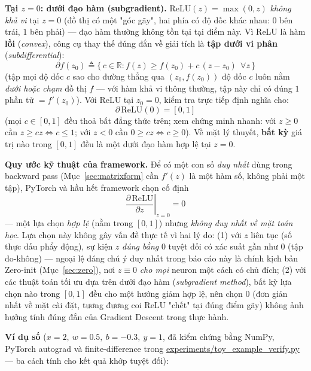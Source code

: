 \documentclass[12pt,a4paper]{article}
\newcommand{\en}[1]{\textit{#1}}
\begin{document}
\textbf{Tại $z=0$: dưới đạo hàm (subgradient).} $\mathrm{ReLU}(z)=\max(0,z)$
\emph{không khả vi} tại $z=0$ (đồ thị có một "góc gãy", hai phía có độ dốc
khác nhau: $0$ bên trái, $1$ bên phải) --- đạo hàm thường không tồn tại tại
điểm này. Vì ReLU là hàm \textbf{lồi} (\en{convex}), công cụ thay thế đúng
đắn về giải tích là \textbf{tập dưới vi phân} (\en{subdifferential}):
$$\partial f(z_0) \triangleq \{\,c\in\mathbb R : f(z) \ge f(z_0) + c\,(z-z_0)\ \ \forall z\,\}$$
(tập mọi độ dốc $c$ sao cho đường thẳng qua $(z_0,f(z_0))$ độ dốc $c$ luôn
nằm \emph{dưới hoặc chạm} đồ thị $f$ --- với hàm khả vi thông thường, tập
này chỉ có đúng $1$ phần tử $=f'(z_0)$). Với $\mathrm{ReLU}$ tại $z_0=0$,
kiểm tra trực tiếp định nghĩa cho:
$$\partial\,\mathrm{ReLU}(0) = [0,1]$$
(mọi $c\in[0,1]$ đều thoả bất đẳng thức trên; xem chứng minh nhanh:
với $z\ge0$ cần $z\ge cz\Leftrightarrow c\le1$; với $z<0$ cần $0\ge cz
\Leftrightarrow c\ge0$). Về mặt lý thuyết, \textbf{bất kỳ} giá trị nào
trong $[0,1]$ đều là một dưới đạo hàm hợp lệ tại $z=0$.

\textbf{Quy ước kỹ thuật của framework.} Để có một con số \emph{duy nhất}
dùng trong backward pass (Mục~\ref{sec:matrixform} cần $f'(z)$ là một hàm
số, không phải một tập), PyTorch và hầu hết framework chọn cố định
$$\left.\frac{\partial\,\mathrm{ReLU}}{\partial z}\right\vert_{z=0} = 0$$
--- một lựa chọn \emph{hợp lệ} (nằm trong $[0,1]$) nhưng \emph{không duy
nhất về mặt toán học}. Lựa chọn này không gây vấn đề thực tế vì hai lý do:
(1) với $z$ liên tục (số thực dấu phẩy động), sự kiện $z$ \emph{đúng bằng}
$0$ tuyệt đối có xác suất gần như $0$ (tập đo-không) --- ngoại lệ đáng chú
ý duy nhất trong báo cáo này là chính kịch bản Zero-init
(Mục~\ref{sec:zero}), nơi $z\equiv0$ \emph{cho mọi} neuron một cách có chủ
đích; (2) với các thuật toán tối ưu dựa trên dưới đạo hàm
(\en{subgradient method}), bất kỳ lựa chọn nào trong $[0,1]$ đều cho một
hướng giảm hợp lệ, nên chọn $0$ (đơn giản nhất về mặt cài đặt, tương
đương coi ReLU "chết" tại đúng điểm gãy) không ảnh hưởng tính đúng đắn
của Gradient Descent trong thực hành.

\textbf{Ví dụ số} ($x=2,\ w=0.5,\ b=-0.3,\ y=1$, đã kiểm chứng bằng
NumPy, PyTorch autograd và finite-difference trong
\url{experiments/toy_example_verify.py} --- ba cách tính cho kết quả
khớp tuyệt đối):
\end{document}
